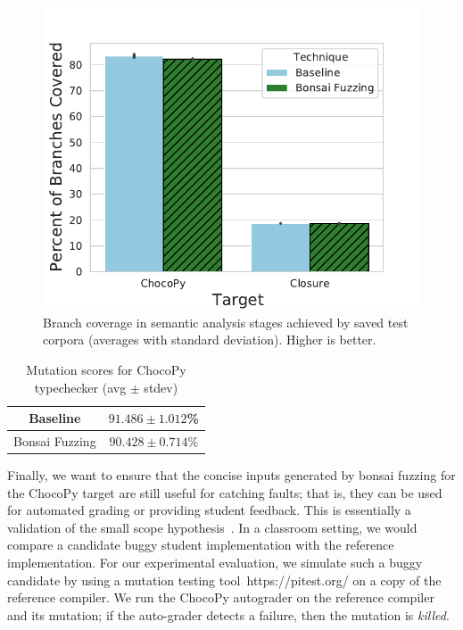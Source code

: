 \documentclass[conference]{IEEEtran}
\newcommand{\tech}{bonsai fuzzing} \newcommand{\Tech}{Bonsai fuzzing} \newcommand{\TECH}{Bonsai Fuzzing}
\begin{document}
\begin{figure}[t]
    \centering
    \includegraphics[scale=0.5]{branch_cov.pdf}
    \caption{Branch coverage in semantic analysis stages achieved by saved test corpora (averages with standard deviation). Higher is better.}
    \label{fig:branch-cov}
    \vspace{-0.3cm}
\end{figure}
\begin{table}
    \centering
    \caption{Mutation scores for ChocoPy typechecker (avg $\pm$ stdev)}
    \label{tab:chocopy-mutation-scores}
    \begin{tabular}{ |c||c|  }
     \hline
        Baseline & $91.486 \pm 1.012$\%\\
        \hline
        \TECH{} & $90.428 \pm 0.714$\% \\
        \hline
    \end{tabular}
\vspace{-0.5cm}
\end{table}

Finally, we want to ensure that the concise inputs generated by \tech{} for the ChocoPy target are still useful for catching faults; that is, they can be used for automated grading or providing student feedback. This is essentially a validation of the small scope hypothesis~\cite{Jackson12}.
In a classroom setting, we would compare a candidate buggy student implementation with the reference implementation. For our experimental evaluation, we simulate such a buggy candidate by using a mutation testing tool~https://pitest.org/ on a copy of the reference compiler. We run the ChocoPy autograder on the reference compiler and its mutation; if the auto-grader detects a failure, then the mutation is \emph{killed}.
\end{document}

